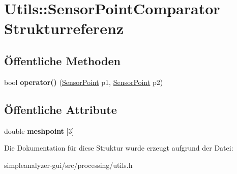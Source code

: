 \hypertarget{structUtils_1_1SensorPointComparator}{\section{Utils\-:\-:Sensor\-Point\-Comparator Strukturreferenz}
\label{structUtils_1_1SensorPointComparator}
}
\subsection*{Öffentliche Methoden}
\begin{DoxyCompactItemize}
\item 
\hypertarget{structUtils_1_1SensorPointComparator_a92795eac49f9ea851c04a623c5a3d6b6}{bool {\bfseries operator()} (\hyperlink{structUtils_1_1SensorPoint}{Sensor\-Point} p1, \hyperlink{structUtils_1_1SensorPoint}{Sensor\-Point} p2)}\label{structUtils_1_1SensorPointComparator_a92795eac49f9ea851c04a623c5a3d6b6}

\end{DoxyCompactItemize}
\subsection*{Öffentliche Attribute}
\begin{DoxyCompactItemize}
\item 
\hypertarget{structUtils_1_1SensorPointComparator_a51335aca914559e34d9202b67d90b143}{double {\bfseries meshpoint} \mbox{[}3\mbox{]}}\label{structUtils_1_1SensorPointComparator_a51335aca914559e34d9202b67d90b143}

\end{DoxyCompactItemize}


Die Dokumentation für diese Struktur wurde erzeugt aufgrund der Datei\-:\begin{DoxyCompactItemize}
\item 
simpleanalyzer-\/gui/src/processing/utils.\-h\end{DoxyCompactItemize}
